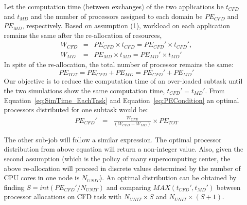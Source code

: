 \documentclass[conference,final]{IEEEtran}
\begin{document}
Let the computation time (between exchanges) of the two applications be $t_{CFD}$ and $t_{MD}$ and the number of processors assigned to each domain be $PE_{CFD}$ and $PE_{MD}$, respectively. Based on assumption (1), workload on each application remains the same after the re-allocation of resources, \begin{eqnarray}
W_{CFD} &=& PE_{CFD} \times t_{CFD} = PE_{CFD}' \times t_{CFD}', \nonumber \\
W_{MD} &=& PE_{MD} \times t_{MD} = PE_{MD}' \times t_{MD}'
\label{eq:SimTime_EachTask}
\end{eqnarray}
In spite of the re-allocation, the total number of processor remains the same:
\begin{equation}
PE_{TOT} = PE_{CFD} + PE_{MD} = PE_{CFD}' + PE_{MD}'
\label{eq:PECondition}
\end{equation}
Our objective is to reduce the computation time of an over-loaded subtask until the  two simulations show the same computation time, $t_{CFD}' = t_{MD}'$. From Equation~\ref{eq:SimTime_EachTask} and Equation~\ref{eq:PECondition} an optimal processors distributed for one subtask would be:
\begin{eqnarray}
PE_{CFD}' & = & \frac {W_{CFD}} {(W_{CFD} + W_{MD})} \times PE_{TOT}
\end{eqnarray}

The other sub-job will follow a similar expression. The optimal processor distribution from above equation will return a non-integer value. Also, given the second assumption (which is the policy of many supercomputing center, the above re-allocation will proceed in discrete values determined by the number of CPU cores in one node is $N_{UNIT}$).  An optimal distribution can be obtained by finding $S = int(PE_{CFD}' / N_{UNIT})$ and comparing $MAX(t_{CFD}',t_{MD}')$ between processor allocations on CFD task with $N_{UNIT} \times S$ and $N_{UNIT} \times (S+1)$.

\end{document}
